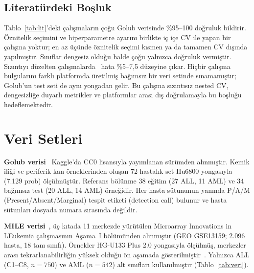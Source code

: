 \documentclass[conference]{IEEEtran}
\begin{document}
\subsection{Literatürdeki Boşluk}
Tablo~\ref{tab:lit}'deki çalışmaların çoğu Golub verisinde \%95--100 doğruluk bildirir. Öznitelik seçimini ve hiperparametre ayarını birlikte iç içe CV ile yapan bir çalışma yoktur; en az üçünde öznitelik seçimi kısmen ya da tamamen CV dışında yapılmıştır. Sınıflar dengesiz olduğu halde çoğu yalnızca doğruluk vermiştir. Sızıntıyı düzelten çalışmalarda~\cite{ambroise2002,diaz2006} hata \%5--7,5 düzeyine çıkar. Hiçbir çalışma bulgularını farklı platformda üretilmiş bağımsız bir veri setinde sınamamıştır; Golub'un test seti de aynı yongadan gelir. Bu çalışma sızıntısız nested CV, dengesizliğe duyarlı metrikler ve platformlar arası dış doğrulamayla bu boşluğu hedeflemektedir.

\section{Veri Setleri}
\textbf{Golub verisi}~\cite{golub1999} Kaggle'da CC0 lisansıyla yayımlanan sürümden alınmıştır. Kemik iliği ve periferik kan örneklerinden oluşan 72 hastalık set Hu6800 yongasıyla (7.129 prob) ölçülmüştür. Referans bölünme 38 eğitim (27 ALL, 11 AML) ve 34 bağımsız test (20 ALL, 14 AML) örneğidir. Her hasta sütununun yanında P/A/M (Present/Absent/Marginal) tespit etiketi (detection call) bulunur ve hasta sütunları dosyada numara sırasında değildir.

\textbf{MILE verisi}~\cite{haferlach2010}, üç kıtada 11 merkezde yürütülen Microarray Innovations in LEukemia çalışmasının Aşama~I bölümünden alınmıştır (GEO GSE13159; 2.096 hasta, 18 tanı sınıfı). Örnekler HG-U133 Plus 2.0 yongasıyla ölçülmüş, merkezler arası tekrarlanabilirliğin yüksek olduğu ön aşamada gösterilmiştir~\cite{kohlmann2008}. Yalnızca ALL (C1--C8, $n=750$) ve AML ($n=542$) alt sınıfları kullanılmıştır (Tablo~\ref{tab:veri}).
\end{document}
